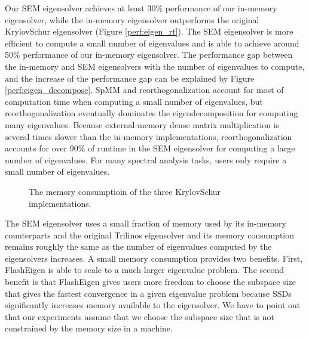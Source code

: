 Our SEM eigensolver achieves at least 30\% performance of our in-memory
eigensolver, while the in-memory eigensolver outperforms the original
KrylovSchur eigensolver (Figure \ref{perf:eigen_rt}). The SEM eigensolver
is more efficient to compute a small number of eigenvalues and is able
to achieve around 50\% performance of our in-memory eigensolver.
The performance gap between the in-memory and SEM eigensolvers with the number
of eigenvalues to compute, and the increase of the performance gap can be
explained by Figure \ref{perf:eigen_decompose}. SpMM and reorthogonalization
account for most of computation time when computing a small number of eigenvalues,
but reorthogonalization eventually dominates the eigendecomposition for computing
many eigenvalues. Because external-memory dense matrix multiplication is several
times slower than the in-memory implementations, reorthogonalization accounts for
over 90\% of runtime in the SEM eigensolver for computing a large number of
eigenvalues. For many spectral analysis tasks, users only require a small number
of eigenvalues.

\begin{figure}
	\begin{center}
		\footnotesize
		\vspace{-15pt}
		
		\vspace{-15pt}
		\caption{The memory consumptioin of the three KrylovSchur
		implementations.}
		\label{perf:eigen_mem}
	\end{center}
\end{figure}

The SEM eigensolver uses a small fraction of memory used by its in-memory
counterparts and the original Trilinos eigensolver and its memory consumption
remains roughly the same as the number of eigenvalues computed by the eigensolvers
increases. A small memory consumption provides two benefits. First, FlashEigen
is able to scale to a much larger eigenvalue problem. The second benefit is that
FlashEigen gives users more freedom to choose the subspace size that gives the
fastest convergence in a given eigenvalue problem because SSDs significantly
increases memory available to the eigensolver. We have to point out that our
experiments assume that we choose the subspace size that is not constrained by
the memory size in a machine.



